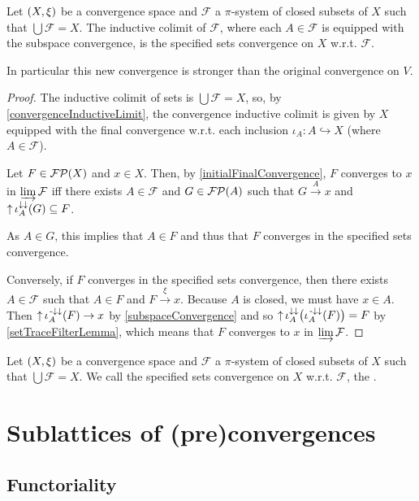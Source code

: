 \begin{proposition}
Let $\left( X,\xi \right)$ be a convergence space and $\mathcal{F}$ a $\pi$-system of closed subsets of $X$ such that $\bigcup \mathcal{F} = X$. The inductive colimit of $\mathcal{F}$, where each $A\in \mathcal{F}$ is equipped with the subspace convergence, is the specified sets convergence on $X$ w.r.t. $\mathcal{F}$.
\end{proposition}
In particular this new convergence is stronger than the original convergence on $V$.
\begin{proof}
The inductive colimit of sets is $\bigcup \mathcal{F} = X$, so, by \ref{convergenceInductiveLimit}, the convergence inductive colimit is given by $X$ equipped with the final convergence w.r.t. each inclusion $\iota_A: A\hookrightarrow X$ (where $A\in \mathcal{F}$).

Let $F\in\operatorname{\mathcal{FP}}(X)$ and $x\in X$. Then, by \ref{initialFinalConvergence}, $F$ converges to $x$ in $\varinjlim \mathcal{F}$ iff there exists $A\in \mathcal{F}$ and $G \in \operatorname{\mathcal{FP}}(A)$ such that $G\overset{A}{\longrightarrow} x$ and $\operatorname{\uparrow}\iota_A^{\downarrow\downarrow}(G) \subseteq F$.

As $A\in G$, this implies that $A\in F$ and thus that $F$ converges in the specified sets convergence.

Conversely, if $F$ converges in the specified sets convergence, then there exists $A\in \mathcal{F}$ such that $A \in F$ and $F\overset{\xi}{\longrightarrow} x$. Because $A$ is closed, we must have $x\in A$. Then $\operatorname{\uparrow}\iota_A^{{\text{\hspace{0.15em}-}\downarrow}\downarrow}(F) \to x$ by \ref{subspaceConvergence} and so $\operatorname{\uparrow}\iota_A^{\downarrow\downarrow}\big(\iota_A^{{\text{\hspace{0.15em}-}\downarrow}\downarrow}(F)\big) = F$ by \ref{setTraceFilterLemma}, which means that $F$ converges to $x$ in $\varinjlim \mathcal{F}$.
\end{proof}

\begin{definition}
Let $\left( X,\xi \right)$ be a convergence space and $\mathcal{F}$ a $\pi$-system of closed subsets of $X$ such that $\bigcup \mathcal{F} = X$. We call the specified sets convergence on $X$ w.r.t. $\mathcal{F}$, the .
\end{definition}

\section{Sublattices of (pre)convergences}
\subsection{Functoriality}

